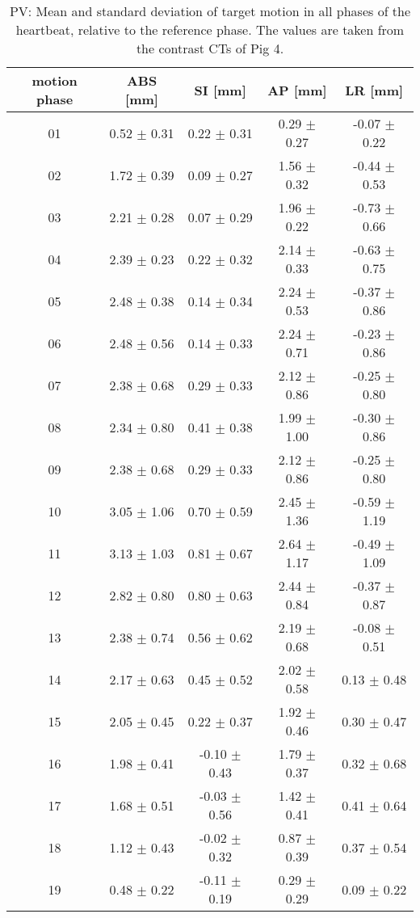 \begin{table}[H]
  \centering
  \scriptsize
  \caption{PV: Mean and standard deviation of target motion in all phases of the heartbeat, relative to the reference phase. The values are 
  taken from the contrast CTs of Pig 4.}
  \begin{tabular}{|c|c|c|c|c|}
    \hline\hline
    motion phase\rule{0pt}{2.6ex}\rule[-1.2ex]{0pt}{0pt} & ABS [mm] & SI [mm] & AP [mm] & LR [mm]\\
    \hline
01 &0.52 $\pm$ 0.31 &0.22 $\pm$ 0.31 &0.29 $\pm$ 0.27 &-0.07 $\pm$ 0.22 \\
02 &1.72 $\pm$ 0.39 &0.09 $\pm$ 0.27 &1.56 $\pm$ 0.32 &-0.44 $\pm$ 0.53 \\
03 &2.21 $\pm$ 0.28 &0.07 $\pm$ 0.29 &1.96 $\pm$ 0.22 &-0.73 $\pm$ 0.66 \\
04 &2.39 $\pm$ 0.23 &0.22 $\pm$ 0.32 &2.14 $\pm$ 0.33 &-0.63 $\pm$ 0.75 \\
05 &2.48 $\pm$ 0.38 &0.14 $\pm$ 0.34 &2.24 $\pm$ 0.53 &-0.37 $\pm$ 0.86 \\
06 &2.48 $\pm$ 0.56 &0.14 $\pm$ 0.33 &2.24 $\pm$ 0.71 &-0.23 $\pm$ 0.86 \\
07 &2.38 $\pm$ 0.68 &0.29 $\pm$ 0.33 &2.12 $\pm$ 0.86 &-0.25 $\pm$ 0.80 \\
08 &2.34 $\pm$ 0.80 &0.41 $\pm$ 0.38 &1.99 $\pm$ 1.00 &-0.30 $\pm$ 0.86 \\
09 &2.38 $\pm$ 0.68 &0.29 $\pm$ 0.33 &2.12 $\pm$ 0.86 &-0.25 $\pm$ 0.80 \\
10 &3.05 $\pm$ 1.06 &0.70 $\pm$ 0.59 &2.45 $\pm$ 1.36 &-0.59 $\pm$ 1.19 \\
11 &3.13 $\pm$ 1.03 &0.81 $\pm$ 0.67 &2.64 $\pm$ 1.17 &-0.49 $\pm$ 1.09 \\
12 &2.82 $\pm$ 0.80 &0.80 $\pm$ 0.63 &2.44 $\pm$ 0.84 &-0.37 $\pm$ 0.87 \\
13 &2.38 $\pm$ 0.74 &0.56 $\pm$ 0.62 &2.19 $\pm$ 0.68 &-0.08 $\pm$ 0.51 \\
14 &2.17 $\pm$ 0.63 &0.45 $\pm$ 0.52 &2.02 $\pm$ 0.58 &0.13 $\pm$ 0.48 \\
15 &2.05 $\pm$ 0.45 &0.22 $\pm$ 0.37 &1.92 $\pm$ 0.46 &0.30 $\pm$ 0.47 \\
16 &1.98 $\pm$ 0.41 &-0.10 $\pm$ 0.43 &1.79 $\pm$ 0.37 &0.32 $\pm$ 0.68 \\
17 &1.68 $\pm$ 0.51 &-0.03 $\pm$ 0.56 &1.42 $\pm$ 0.41 &0.41 $\pm$ 0.64 \\
18 &1.12 $\pm$ 0.43 &-0.02 $\pm$ 0.32 &0.87 $\pm$ 0.39 &0.37 $\pm$ 0.54 \\
19 &0.48 $\pm$ 0.22 &-0.11 $\pm$ 0.19 &0.29 $\pm$ 0.29 &0.09 $\pm$ 0.22 \\
    \hline\hline
  \end{tabular}
  \label{tab:motion:PV:Pig4}
\end{table}

